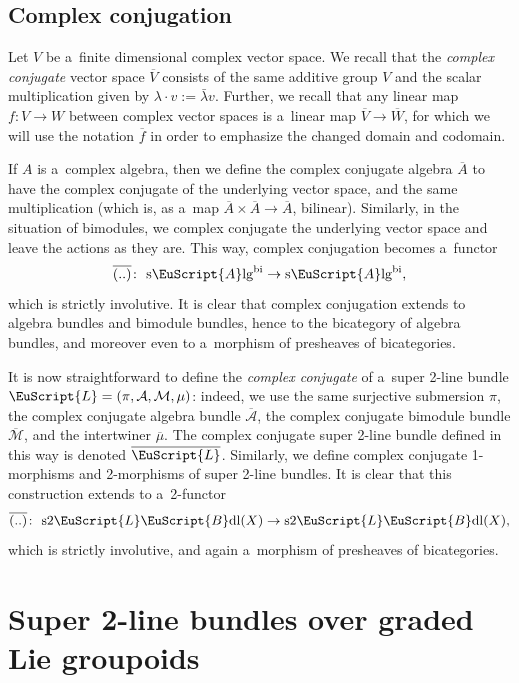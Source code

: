 \documentclass[pdftex]{sigma}
\numberwithin{equation}{section}
\def\mathscr#1{\EuScript{#1}}
\newcommand{\LineBdl}{\mathscr{L}\mathscr{B}\mathrm{dl}}
\newcommand{\stwoLineBdl}{\mathrm{s}2\LineBdl}
\newcommand{\Alg}{\Incl\mathrm{lg}}
\newcommand{\sAlg}{\mathrm{s}\Alg}
\newcommand{\sAlgbi}{\sAlg^{\mathrm{bi}}}
\newcommand{\Incl}{\mathscr{A}}
\begin{document}
\subsection{Complex conjugation}
\label{complex-conjugation}

Let $V$ be a~finite dimensional complex vector space. We recall that the \emph{complex conjugate} vector space $\overline{V}$ consists of the same additive group
$V$ and the scalar multiplication given by $\lambda \cdot v := \bar\lambda v$. Further, we recall that any linear map $f\colon V \to W$ between complex
vector spaces is a~linear map $\overline{V} \to \overline{W}$, for which we will use the notation $\overline{f}$ in order to emphasize the changed domain and codomain.


If $A$ is a~complex algebra, then we define the complex conjugate algebra $\overline{A}$ to have the complex conjugate of the underlying vector space, and the same multiplication (which is, as a~map $\overline{A} \times \overline{A} \to \overline{A}$, bilinear). Similarly, in the situation of bimodules, we complex conjugate the underlying vector space and leave the actions as they are. This way, complex conjugation becomes a~functor
\begin{equation*}
\overline{(..)}\colon\ \sAlgbi \to \sAlgbi,
\end{equation*}
which is strictly involutive.
It is clear that complex conjugation extends to algebra bundles and bimodule bundles, hence to the bicategory of algebra bundles, and moreover even to a~morphism of presheaves of bicategories.


It is now straightforward
to define the \emph{complex conjugate} of a~super 2-line bundle $\mathscr{L}=(\pi,\mathcal{A},\mathcal{M},\mu)$: indeed, we use the same surjective submersion
$\pi$, the complex conjugate algebra bundle $\overline{\mathcal{A}}$, the complex conjugate bimodule bundle $\overline{\mathcal{M}}$, and the intertwiner $\overline{\mu}$.
The complex conjugate super 2-line bundle defined in this way is denoted $\overline{\mathscr{L}}$. Similarly, we define complex conjugate 1-morphisms and 2-morphisms of super 2-line bundles.
It is clear that this construction extends to a~2-functor
\begin{equation}
\label{complex-conjugation-2-functor}
\overline{(..)} \colon\ \stwoLineBdl(X) \to \stwoLineBdl(X),
\end{equation}
which is strictly involutive, and again a~morphism of presheaves of bicategories.

\section{Super 2-line bundles over graded Lie groupoids}
\label{extension-to-graded-lie-groupoids}
\end{document}
